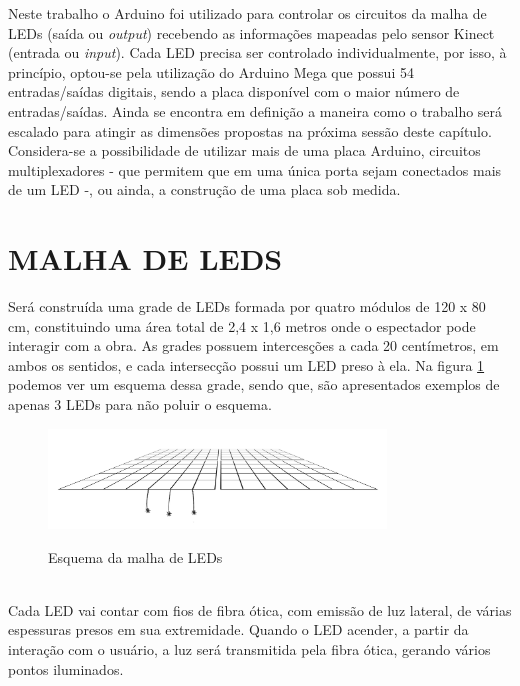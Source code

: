 Neste trabalho o Arduino foi utilizado para controlar os circuitos da malha de LEDs (saída ou \textit{output}) recebendo as informações mapeadas pelo sensor Kinect (entrada ou \textit{input}). Cada LED precisa ser controlado individualmente, por isso, à princípio, optou-se pela utilização do Arduino Mega que possui 54 entradas/saídas digitais, sendo a placa disponível com o maior número de entradas/saídas. Ainda se encontra em definição a maneira como o trabalho será escalado para atingir as dimensões propostas na próxima sessão deste capítulo. Considera-se a possibilidade de utilizar mais de uma placa Arduino, circuitos multiplexadores - que permitem que em uma única porta sejam conectados mais de um LED -, ou ainda, a construção de uma placa sob medida.

\section{MALHA DE LEDS}
\label{sec:malha}

Será construída uma grade de LEDs formada por quatro módulos de 120 x 80 cm, constituindo uma área total de 2,4 x 1,6 metros onde o espectador pode interagir com a obra. As grades possuem intercesções a cada 20 centímetros, em ambos os sentidos, e cada intersecção possui um LED preso à ela. Na figura \ref{fig:malha} podemos ver um esquema dessa grade, sendo que, são apresentados exemplos de apenas 3 LEDs para não poluir o esquema.

\begin{figure}[H]
    \centering
    \caption{Esquema da malha de LEDs}
	\vspace*{0,2cm}
    \includegraphics[width=0.8\textwidth]{./04-figuras/malha}
    \label{fig:malha}
\end{figure}
\vspace*{-0,9cm}
{\raggedright {}}\\

Cada LED vai contar com fios de fibra ótica, com emissão de luz lateral, de várias espessuras presos em sua extremidade. Quando o LED acender, a partir da interação com o usuário, a luz será transmitida pela fibra ótica, gerando vários pontos iluminados.


